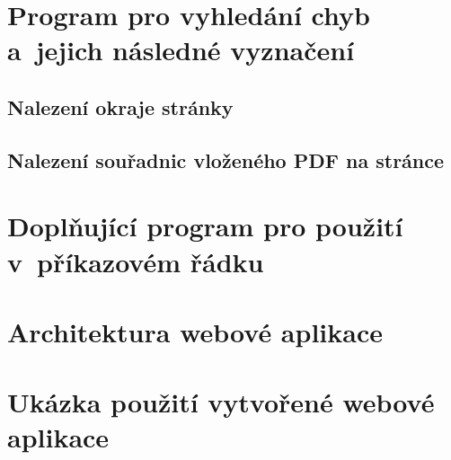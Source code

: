 \dummyText


\section{Program pro vyhledání chyb a~jejich následné vyznačení}

\DummyText

\subsection*{Nalezení okraje stránky}

\dummyShortText[10]

\dummyText[2]


\subsection*{Nalezení souřadnic vloženého PDF na stránce}

\dummyShortText[10]

\dummyText[2]



\section{Doplňující program pro použití v~příkazovém řádku}

\dummyText

\dummyText[2]



\section{Architektura webové aplikace}

\dummyText

\dummyText[2]



\section{Ukázka použití vytvořené webové aplikace}

